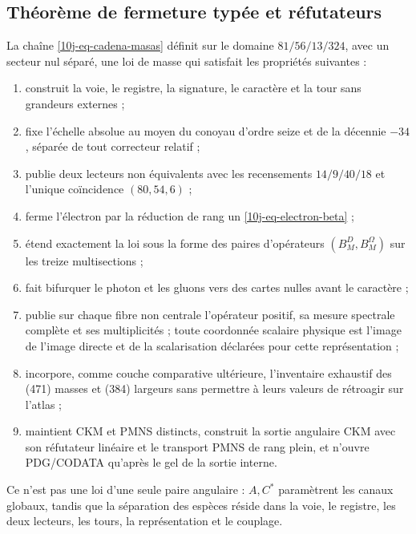 \subsection{Théorème de fermeture typée et réfutateurs}

\begin{theorem}
\label{10j-thm-ley-general}
La chaîne \eqref{10j-eq-cadena-masas} définit sur le domaine \(81/56/13/324\), avec un secteur nul séparé, une loi de masse qui satisfait les propriétés suivantes :
\begin{enumerate}
 \item construit la voie, le registre, la signature, le caractère et la tour sans grandeurs externes ;
 \item fixe l'échelle absolue au moyen du conoyau d'ordre seize et de la décennie \(-34\), séparée de tout correcteur relatif ;
 \item publie deux lecteurs non équivalents avec les recensements \(14/9/40/18\) et l'unique coïncidence \((80,54,6)\) ;
 \item ferme l'électron par la réduction de rang un \eqref{10j-eq-electron-beta} ;
 \item étend exactement la loi sous la forme des paires d'opérateurs \((B_M^D,B_M^\Omega)\) sur les treize multisections ;
 \item fait bifurquer le photon et les gluons vers des cartes nulles avant le caractère ;
 \item publie sur chaque fibre non centrale l'opérateur positif, sa mesure spectrale complète et ses multiplicités ; toute coordonnée scalaire physique est l'image de l'image directe et de la scalarisation déclarées pour cette représentation ;
 \item incorpore, comme couche comparative ultérieure, l'inventaire exhaustif des (471) masses et (384) largeurs sans permettre à leurs valeurs de rétroagir sur l'atlas ;
 \item maintient CKM et PMNS distincts, construit la sortie angulaire CKM avec son réfutateur linéaire et le transport PMNS de rang plein, et n'ouvre PDG/CODATA qu'après le gel de la sortie interne.
\end{enumerate}
Ce n'est pas une loi d'une seule paire angulaire : \(A,C^*\) paramètrent les canaux globaux, tandis que la séparation des espèces réside dans la voie, le registre, les deux lecteurs, les tours, la représentation et le couplage.
\end{theorem}

